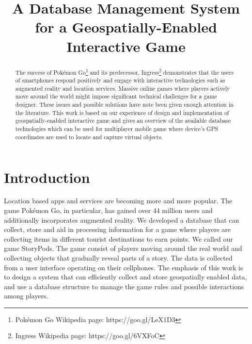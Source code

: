 \documentclass[conference]{IEEEtran}
\begin{document}
\title{A Database Management System for a Geospatially-Enabled Interactive Game}
\author{
\and
{}
\and
{}
\and
{}
}

\maketitle

\begin{abstract}
The success of Pokémon Go\footnote[1]{Pokémon Go Wikipedia page: https://goo.gl/LeX1D3} and its predecessor, Ingress\footnote[2]{Ingress Wikipedia page: https://goo.gl/6VXFoC} demonstrates that the users of smartphones respond positively and engage with interactive technologies such as augmented reality and location services. Massive online games where players actively move around the world might impose significant technical challenges for a game designer. These issues and possible solutions have note been given enough attention in the literature. This work is based on our experience of design and implementation of geospatially-enabled interactive game and gives an overview of the available database technologies which can be used for multiplayer mobile game where device's GPS coordinates are used to locate and capture virtual objects. 
\end{abstract}

\IEEEpeerreviewmaketitle

\section{Introduction}
Location based apps and services are becoming more and more popular. The game Pokémon Go, in particular, has gained over 44 million users and additionally incorporates augmented reality. We developed a database that can collect, store and aid in processing information for a game where players are collecting items in different tourist destinations to earn points. We called our game StoryPods. The game consist of players moving around the real world and collecting objects that gradually reveal parts of a story. The data is collected from a user interface operating on their cellphones. The emphasis of this work is to design a system that can efficiently collect and store geospatially enabled data, and use a database structure to manage the game rules and possible interactions among players. 
\end{document}
